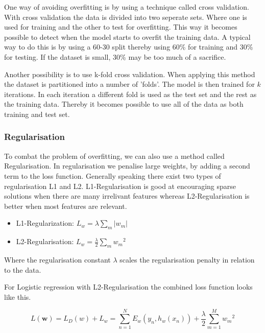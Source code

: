 One way of avoiding overfitting is by using a technique called cross validation.
With cross validation the data is divided into two seperate sets.
Where one is used for training and the other to test for overfitting. 
This way it becomes possible to detect when the model starts to overfit the training data.
A typical way to do this is by using a 60-30 split thereby using 60\% for training and 30\% for testing.
If the dataset is small, 30\% may be too much of a sacrifice.

Another possibility is to use k-fold cross validation.
When applying this method the dataset is partitioned into a number of 'folds'.
The model is then trained for $k$ iterations.
In each iteration a different fold is used as the test set and the rest as the training data.
Thereby it becomes possible to use all of the data as both training and test set.
\begin{flushright}
\cite[p. 324]{AI2010}
\end{flushright}

\subsubsection{Regularisation}

To combat the problem of overfitting, we can also use a method called Regularisation.
In regularisation we penalise large weights, by adding a second term to the loss function.
Generally speaking there exist two types of regularisation L1 and L2.
L1-Regularisation is good at encouraging sparse solutions when there are many irrelivant features whereas L2-Regularisation is better when most features are relevant.

\begin{itemize}
\item L1-Regularization: $L_w = \lambda \sum_{m} \vert w_m \vert $ \\
\item L2-Regularisation: $L_w = \frac{\lambda}{2} \sum_{m} {w_m}^2$
\end{itemize}

Where the regularisation constant $\lambda$ scales the regularisation penalty in relation to the data. 

For Logistic regression with L2-Regularisation the combined loss function looks like this.

\[ L(\textbf{w})
  = L_D(w) + L_w 
  = \sum_{n=1}^N E_w(y_n, h_w(x_n)) + \frac{\lambda}{2} \sum_{m=1}^{M} {w_m}^2 \] 

